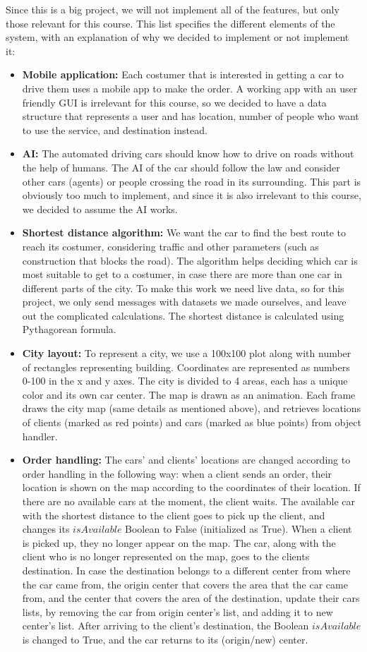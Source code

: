 \documentclass[a4paper]{article}
\begin{document}
Since this is a big project, we will not implement all of the features, but only those relevant for this course. This list specifies the different elements of the system, with an explanation of why we decided to implement or not implement it:
\begin{itemize}
    \item \textbf{Mobile application:} Each costumer that is interested in getting a car to drive them uses a mobile app to make the order. A working app with an user friendly GUI is irrelevant for this course, so we decided to have a data structure that represents a user and has location, number of people who want to use the service, and destination instead.
    \item \textbf{AI:} The automated driving cars should know how to drive on roads without the help of humans. The AI of the car should follow the law and consider other cars (agents) or people crossing the road in its surrounding. This part is obviously too much to implement, and since it is also irrelevant to this course, we decided to assume the AI works.
    \item \textbf{Shortest distance algorithm:} We want the car to find the best route to reach its costumer, considering traffic and other parameters (such as construction that blocks the road). The algorithm helps deciding which car is most suitable to get to a costumer, in case there are more than one car in different parts of the city. To make this work we need live data, so for this project, we only send messages with datasets we made ourselves, and leave out the complicated calculations. The shortest distance is calculated using Pythagorean formula.
    \item \textbf{City layout:} To represent a city, we use a 100x100 plot along with number of rectangles representing building. Coordinates are represented as numbers 0-100 in the x and y axes. The city is divided to 4 areas, each has a unique color and its own car center. The map is drawn as an animation. Each frame draws the city map (same details as mentioned above), and retrieves locations of clients (marked as red points) and cars (marked as blue points) from object handler. 
    \item \textbf{Order handling:} The cars' and clients' locations are changed according to order handling in the following way: when a client sends an order, their location is shown on the map according to the coordinates of their location. If there are no available cars at the moment, the client waits. The available car with the shortest distance to the client goes to pick up the client, and changes its $isAvailable$ Boolean to False (initialized as True). When a client is picked up, they no longer appear on the map. The car, along with the client who is no longer represented on the map, goes to the clients destination. In case the destination belongs to a different center from where the car came from, the origin center that covers the area that the car came from, and the center that covers the area of the destination, update their cars lists, by removing the car from origin center's list, and adding it to new center's list. After arriving to the client's destination, the Boolean $isAvailable$ is changed to True, and the car returns to its (origin/new) center.

\end{itemize}
\end{document}
